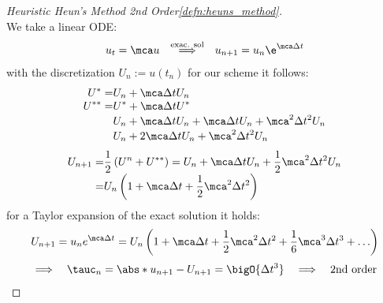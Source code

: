 \begin{proofbox}\nospacing
    \begin{proof}[Heuristic Heun's Method 2nd Order\cref{defn:heuns_method}]\label{proof:defn:heuns_method_order}\leavevmode\\
        We take a linear ODE:
        \begin{align*}
          u_{t}=\mca u&&\stackrel{\text{exac. sol}}{\implies}&&
                                                                u_{n+1}=u_{n}\e^{\mca\Delta t}
        \end{align*}
        with the discretization $U_{n}:=u(t_{n})$ for our scheme it follows:
        \begin{align*}
          U^{*}=&U_{n}+\mca\Delta t U_{n}\\[-1\jot]
          U^{**}=&U^{*}+\mca\Delta t U^{*}\\[-1\jot]
                &U_{n}+\mca\Delta t U_{n}+\mca\Delta t U_{n}+\mca^{2}\Delta t^{2} U_{n}\\[-1\jot]
                &U_{n}+2\mca\Delta t U_{n}+\mca^{2}\Delta t^{2} U_{n}
        \end{align*}
        \begin{align*}
          U_{n+1}=&\frac{1}{2}\left(U^{n}+U^{**}\right)=U_{n}+\mca\Delta t U_{n}+\frac{1}{2}\mca^{2}\Delta t^{2} U_{n}\\[-1\jot]
          =&U_{n}\left(1+\mca\Delta t+\frac{1}{2}\mca^{2}\Delta t^{2}\right)
        \end{align*}
        for a Taylor expansion of the exact solution it holds:
        \begin{align*}
          U_{n+1}=u_{n}e^{\mca\Delta t}=U_{n} \left(1+\mca\Delta t+\frac{1}{2}\mca^{2}\Delta t^{2}+\frac{1}{6}\mca^{3}\Delta t^{3}+\ldots\right)
        \end{align*}
        \begin{align*}
          \implies&&\tauc_{n}=\abs*{u_{n+1}-U_{n+1}}=\bigO{\Delta t^{3}}&&\implies&&\text{2nd order}
        \end{align*}
    \end{proof}
\end{proofbox}

